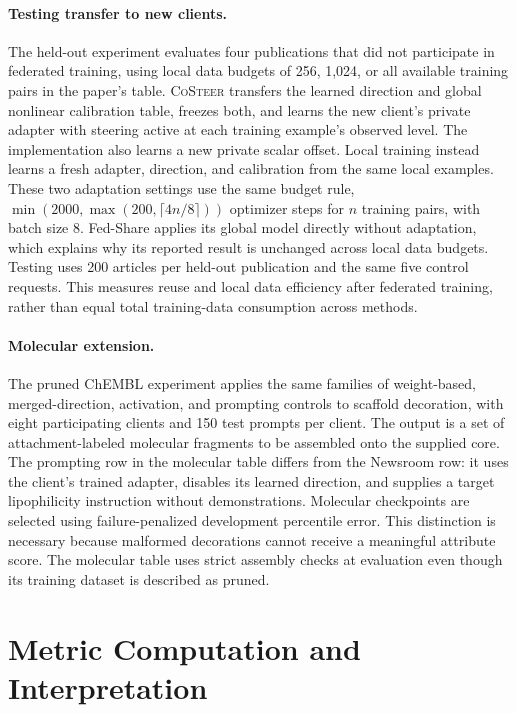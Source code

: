 \documentclass[11pt]{article}
\newcommand{\costeer}{\textsc{CoSteer}}
\begin{document}
\paragraph{Testing transfer to new clients.}
The held-out experiment evaluates four publications that did not participate in federated training, using local data budgets of 256, 1,024, or all available training pairs in the paper's table. \costeer{} transfers the learned direction and global nonlinear calibration table, freezes both, and learns the new client's private adapter with steering active at each training example's observed level. The implementation also learns a new private scalar offset. Local training instead learns a fresh adapter, direction, and calibration from the same local examples. These two adaptation settings use the same budget rule, $\min(2000,\max(200,\lceil4n/8\rceil))$ optimizer steps for $n$ training pairs, with batch size 8. Fed-Share applies its global model directly without adaptation, which explains why its reported result is unchanged across local data budgets. Testing uses 200 articles per held-out publication and the same five control requests. This measures reuse and local data efficiency after federated training, rather than equal total training-data consumption across methods.

\paragraph{Molecular extension.}
The pruned ChEMBL experiment applies the same families of weight-based, merged-direction, activation, and prompting controls to scaffold decoration, with eight participating clients and 150 test prompts per client. The output is a set of attachment-labeled molecular fragments to be assembled onto the supplied core. The prompting row in the molecular table differs from the Newsroom row: it uses the client's trained adapter, disables its learned direction, and supplies a target lipophilicity instruction without demonstrations. Molecular checkpoints are selected using failure-penalized development percentile error. This distinction is necessary because malformed decorations cannot receive a meaningful attribute score. The molecular table uses strict assembly checks at evaluation even though its training dataset is described as pruned.

\section{Metric Computation and Interpretation}
\label{sec:costeer-metrics}
\end{document}
